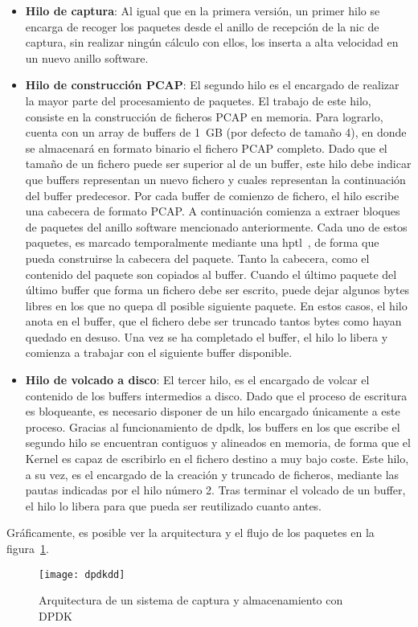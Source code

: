 \begin{itemize}
\item \textbf{Hilo de captura}: Al igual que en la primera versión, un primer hilo se encarga de recoger los paquetes desde el anillo de recepción de la \gls{nic} de captura, sin realizar ningún cálculo con ellos, los inserta a alta velocidad en un nuevo anillo software.

\item \textbf{Hilo de construcción PCAP}: El segundo hilo es el encargado de realizar la mayor parte del procesamiento de paquetes. El trabajo de este hilo, consiste en la construcción de ficheros PCAP en memoria. Para lograrlo, cuenta con un array de buffers de 1~GB (por defecto de tamaño 4), en donde se almacenará en formato binario el fichero PCAP completo. Dado que el tamaño de un fichero puede ser superior al de un buffer, este hilo debe indicar que buffers representan un nuevo fichero y cuales representan la continuación del buffer predecesor. Por cada buffer de comienzo de fichero, el hilo escribe una cabecera de formato PCAP. A continuación comienza a extraer bloques de paquetes del anillo software mencionado anteriormente. Cada uno de estos paquetes, es marcado temporalmente mediante una \gls{hptl}~\cite{bib:hptl}, de forma que pueda construirse la cabecera del paquete. Tanto la cabecera, como el contenido del paquete son copiados al buffer.
Cuando el último paquete del último buffer que forma un fichero debe ser escrito, puede dejar algunos bytes libres en los que no quepa dl posible siguiente paquete. En estos casos, el hilo anota en el buffer, que el fichero debe ser truncado tantos bytes como hayan quedado en desuso. Una vez se ha completado el buffer, el hilo lo libera y comienza a trabajar con el siguiente buffer disponible.

\item \textbf{Hilo de volcado a disco}: El tercer hilo, es el encargado de volcar el contenido de los buffers intermedios a disco. Dado que el proceso de escritura es bloqueante, es necesario disponer de un hilo encargado únicamente a este proceso.
Gracias al funcionamiento de \gls{dpdk}, los buffers en los que escribe el segundo hilo se encuentran contiguos y alineados en memoria, de forma que el Kernel es capaz de escribirlo en el fichero destino a muy bajo coste. Este hilo, a su vez, es el encargado de la creación y truncado de ficheros, mediante las pautas indicadas por el hilo número 2. Tras terminar el volcado de un buffer, el hilo lo libera para que pueda ser reutilizado cuanto antes. 
\end{itemize}

Gráficamente, es posible ver la arquitectura y el flujo de los paquetes en la figura~\ref{fig:dis:dpdkdd}.

\begin{figure}[!th]
\centering
\texttt{[image: dpdkdd]}
\caption{Arquitectura de un sistema de captura y almacenamiento con DPDK}
\label{fig:dis:dpdkdd}
\end{figure}











